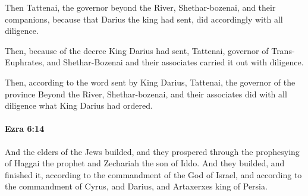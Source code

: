 			\begin{versebox}
					\item[BHS] 
					\item[LXX] 
					\item[ASV] Then Tattenai, the governor beyond the River, Shethar-bozenai, and their companions, because that Darius the king had sent, did accordingly with all diligence.
					\item[NIV] Then, because of the decree King Darius had sent, Tattenai, governor of Trans-Euphrates, and Shethar-Bozenai and their associates carried it out with diligence.
					\item[NRSV] Then, according to the word sent by King Darius, Tattenai, the governor of the province Beyond the River, Shethar-bozenai, and their associates did with all diligence what King Darius had ordered.
			\end{versebox}

		\paragraph{Ezra 6:14} %
			\label{EZRA-6-14}

			And the elders of the Jews builded, and they prospered through the prophesying of Haggai the prophet and Zechariah the son of Iddo. And they builded, and finished it, according to the commandment of the God of Israel, and according to the commandment of Cyrus, and Darius, and Artaxerxes king of Persia.

